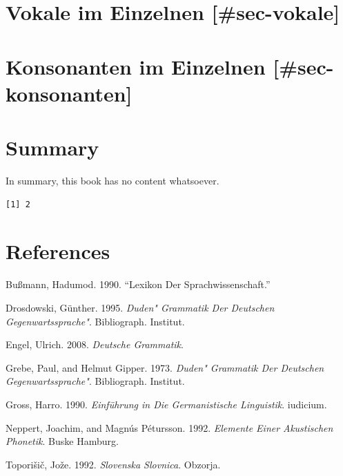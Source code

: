 \documentclass[
  letterpaper,
]{scrbook}
\newlength{\cslhangindent}
\newlength{\cslentryspacingunit} %
\newenvironment{CSLReferences}[2] %
 {%
  \setlength{\parindent}{0pt}
  \ifodd #1
  \let\oldpar\par
  \def\par{\hangindent=\cslhangindent\oldpar}
  \fi
  \setlength{\parskip}{#2\cslentryspacingunit}
 }%
 {}
\begin{document}
\hypertarget{vokale-im-einzelnen-sec-vokale}{%
\chapter{Vokale im Einzelnen
{[}\#sec-vokale{]}}\label{vokale-im-einzelnen-sec-vokale}}

\hypertarget{konsonanten-im-einzelnen-sec-konsonanten}{%
\chapter{Konsonanten im Einzelnen
{[}\#sec-konsonanten{]}}\label{konsonanten-im-einzelnen-sec-konsonanten}}


\hypertarget{summary}{%
\chapter{Summary}\label{summary}}

In summary, this book has no content whatsoever.

\begin{verbatim}
[1] 2
\end{verbatim}


\hypertarget{references}{%
\chapter*{References}\label{references}}


\hypertarget{refs}{}
\begin{CSLReferences}{1}{0}
\leavevmode{}%
Bußmann, Hadumod. 1990. {``Lexikon Der Sprachwissenschaft.''}

\leavevmode{}%
Drosdowski, Günther. 1995. \emph{Duden" Grammatik Der Deutschen
Gegenwartssprache"}. Bibliograph. Institut.

\leavevmode{}%
Engel, Ulrich. 2008. \emph{Deutsche Grammatik}.

\leavevmode{}%
Grebe, Paul, and Helmut Gipper. 1973. \emph{Duden" Grammatik Der
Deutschen Gegenwartssprache"}. Bibliograph. Institut.

\leavevmode{}%
Gross, Harro. 1990. \emph{Einf{ü}hrung in Die Germanistische
Linguistik}. iudicium.

\leavevmode{}%
Neppert, Joachim, and Magnús Pétursson. 1992. \emph{Elemente Einer
Akustischen Phonetik}. Buske Hamburg.

\leavevmode{}%
Toporišič, Jože. 1992. \emph{Slovenska Slovnica}. Obzorja.

\end{CSLReferences}


\backmatter

\printindex
\end{document}
